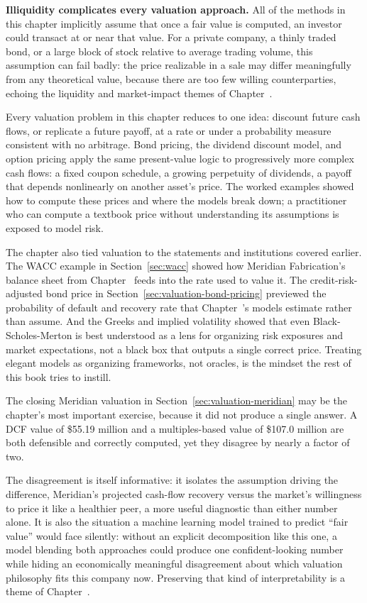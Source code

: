 \documentclass[../ai_in_finance]{subfiles}
\begin{document}
\textbf{Illiquidity complicates every valuation approach.} All of the methods in this chapter implicitly assume that once a fair value is computed, an investor could transact at or near that value. For a private company, a thinly traded bond, or a large block of stock relative to average trading volume, this assumption can fail badly: the price realizable in a sale may differ meaningfully from any theoretical value, because there are too few willing counterparties, echoing the liquidity and market-impact themes of Chapter~.


Every valuation problem in this chapter reduces to one idea: discount future cash flows, or replicate a future payoff, at a rate or under a probability measure consistent with no arbitrage. Bond pricing, the dividend discount model, and option pricing apply the same present-value logic to progressively more complex cash flows: a fixed coupon schedule, a growing perpetuity of dividends, a payoff that depends nonlinearly on another asset's price. The worked examples showed how to compute these prices and where the models break down; a practitioner who can compute a textbook price without understanding its assumptions is exposed to model risk.

The chapter also tied valuation to the statements and institutions covered earlier. The WACC example in Section~\ref{sec:wacc} showed how Meridian Fabrication's balance sheet from Chapter~ feeds into the rate used to value it. The credit-risk-adjusted bond price in Section~\ref{sec:valuation-bond-pricing} previewed the probability of default and recovery rate that Chapter~'s models estimate rather than assume. And the Greeks and implied volatility showed that even Black-Scholes-Merton is best understood as a lens for organizing risk exposures and market expectations, not a black box that outputs a single correct price. Treating elegant models as organizing frameworks, not oracles, is the mindset the rest of this book tries to instill.

The closing Meridian valuation in Section~\ref{sec:valuation-meridian} may be the chapter's most important exercise, because it did not produce a single answer. A DCF value of \$55.19 million and a multiples-based value of \$107.0 million are both defensible and correctly computed, yet they disagree by nearly a factor of two.

The disagreement is itself informative: it isolates the assumption driving the difference, Meridian's projected cash-flow recovery versus the market's willingness to price it like a healthier peer, a more useful diagnostic than either number alone.
It is also the situation a machine learning model trained to predict ``fair value'' would face silently: without an explicit decomposition like this one, a model blending both approaches could produce one confident-looking number while hiding an economically meaningful disagreement about which valuation philosophy fits this company now. Preserving that kind of interpretability is a theme of Chapter~.
\end{document}
